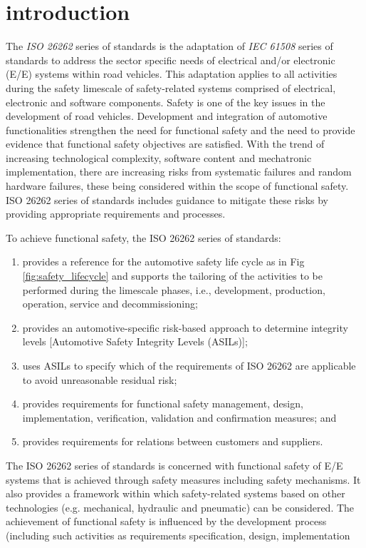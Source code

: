 \documentclass[./dissertation.tex]{subfiles}
\begin{document}
\section{introduction}

The \textit{ISO 26262} series of standards is the adaptation of \textit{IEC 61508} series of standards to address the sector specific needs of electrical and/or electronic (E/E) systems within road vehicles. This adaptation applies to all activities during the safety limescale of safety-related systems comprised of electrical, electronic and software components. Safety is one of the key issues in the development of road vehicles. Development and integration of automotive functionalities strengthen the need for functional safety and the need to provide evidence that functional safety objectives are satisfied. With the trend of increasing technological complexity, software content and mechatronic implementation, there are increasing risks from systematic failures and random hardware failures, these being considered within the scope of functional safety. ISO 26262 series of standards includes guidance to mitigate these risks by providing appropriate requirements and processes.

To achieve functional safety, the ISO 26262 series of standards:
\begin{enumerate}
\item provides a reference for the automotive safety life cycle as in Fig \ref{fig:safety_lifecycle} and supports the tailoring of the activities to be performed during the limescale phases, i.e., development, production, operation, service and decommissioning;
\item provides an automotive-specific risk-based approach to determine integrity levels [Automotive Safety Integrity Levels (ASILs)];
\item uses ASILs to specify which of the requirements of ISO 26262 are applicable to avoid unreasonable residual risk;
\item provides requirements for functional safety management, design, implementation, verification, validation and confirmation measures; and
\item provides requirements for relations between customers and suppliers.
\end{enumerate}

The ISO 26262 series of standards is concerned with functional safety of E/E systems that is achieved through safety measures including safety mechanisms. It also provides a framework within which safety-related systems based on other technologies (e.g. mechanical, hydraulic and pneumatic) can be considered. The achievement of functional safety is influenced by the development process (including such activities as requirements specification, design, implementation
\end{document}
